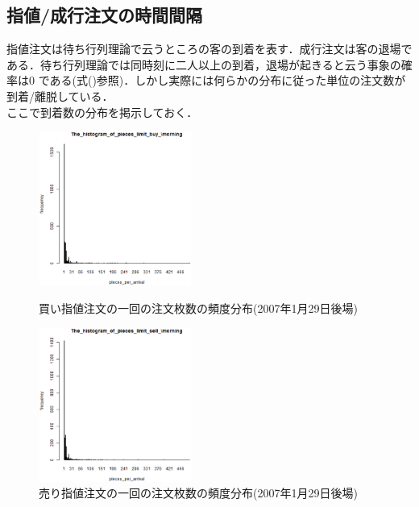 \documentclass[a4j,papersize,disablejfam,slide,14pt]{jsarticle}
\begin{document}
\subsection{指値/成行注文の時間間隔}
	指値注文は待ち行列理論で云うところの客の到着を表す．成行注文は客の退場である．待ち行列理論では同時刻に二人以上の到着，退場が起きると云う事象の確率は$0$
    である(式()参照)．しかし実際には何らかの分布に従った単位の注文数が到着/離脱している．\\
    ここで到着数の分布を掲示しておく．
    
    \begin{figure}[H]
    	\begin{minipage}{1\hsize}
        	\begin{center}
    			\includegraphics[clip,width = 5.0cm]{graphics/pieces_limit_buy20070129_.eps}
            \end{center}
            \caption{\scriptsize 買い指値注文の一回の注文枚数の頻度分布(2007年1月29日後場)}
        \end{minipage}
        \begin{minipage}{1\hsize}
        	\begin{center}
    			\includegraphics[clip,width = 5.0cm]{graphics/pieces_limit_sell20070129_.eps}
            \end{center}
            \caption{\scriptsize 売り指値注文の一回の注文枚数の頻度分布(2007年1月29日後場)}
        \end{minipage}
    \end{figure}
\end{document}
